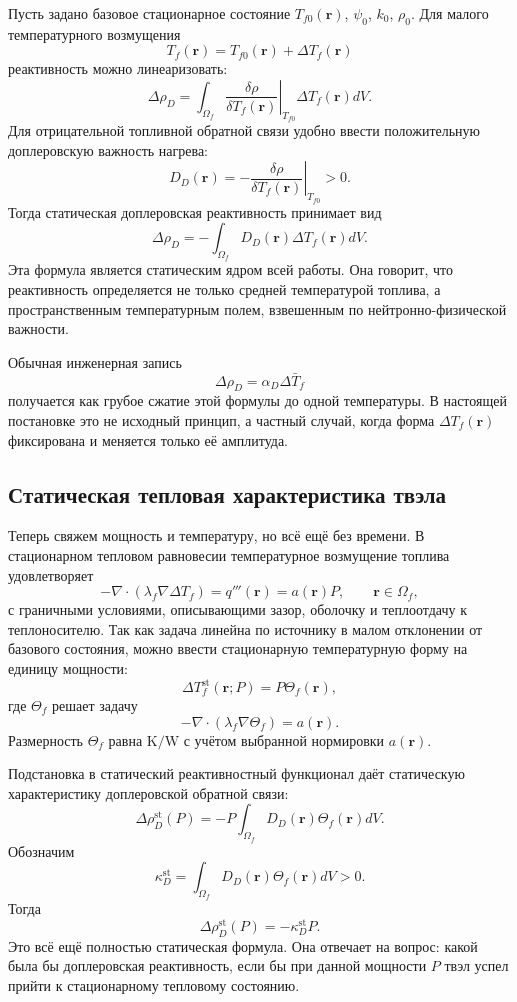 \documentclass[12pt]{article}
\begin{document}
Пусть задано базовое стационарное состояние \(T_{f0}(\mathbf r)\), \(\psi_0\), \(k_0\), \(\rho_0\). Для малого температурного возмущения
\[
T_f(\mathbf r)=T_{f0}(\mathbf r)+\Delta T_f(\mathbf r)
\]
реактивность можно линеаризовать:
\[
\Delta\rho_D
=
\int_{\Omega_f}
\left.
\frac{\delta\rho}{\delta T_f(\mathbf r)}
\right|_{T_{f0}}
\Delta T_f(\mathbf r)dV.
\]
Для отрицательной топливной обратной связи удобно ввести положительную доплеровскую важность нагрева:
\[
D_D(\mathbf r)
=
-
\left.
\frac{\delta\rho}{\delta T_f(\mathbf r)}
\right|_{T_{f0}}
>0.
\]
Тогда статическая доплеровская реактивность принимает вид
\[
\boxed{
\Delta\rho_D
=
-
\int_{\Omega_f}
D_D(\mathbf r)\Delta T_f(\mathbf r)dV.
}
\]
Эта формула является статическим ядром всей работы. Она говорит, что реактивность определяется не только средней температурой топлива, а пространственным температурным полем, взвешенным по нейтронно-физической важности.

Обычная инженерная запись
\[
\Delta\rho_D=\alpha_D\Delta\bar T_f
\]
получается как грубое сжатие этой формулы до одной температуры. В настоящей постановке это не исходный принцип, а частный случай, когда форма \(\Delta T_f(\mathbf r)\) фиксирована и меняется только её амплитуда.

\subsection{Статическая тепловая характеристика твэла}

Теперь свяжем мощность и температуру, но всё ещё без времени. В стационарном тепловом равновесии температурное возмущение топлива удовлетворяет
\[
-
\nabla\cdot\left(\lambda_f\nabla\Delta T_f\right)
=
q'''(\mathbf r)
=
a(\mathbf r)P,
\qquad
\mathbf r\in\Omega_f,
\]
с граничными условиями, описывающими зазор, оболочку и теплоотдачу к теплоносителю. Так как задача линейна по источнику в малом отклонении от базового состояния, можно ввести стационарную температурную форму на единицу мощности:
\[
\Delta T_f^{\mathrm{st}}(\mathbf r;P)
=P\Theta_f(\mathbf r),
\]
где \(\Theta_f\) решает задачу
\[
-
\nabla\cdot\left(\lambda_f\nabla\Theta_f\right)
=
a(\mathbf r).
\]
Размерность \(\Theta_f\) равна \(\mathrm{K/W}\) с учётом выбранной нормировки \(a(\mathbf r)\).

Подстановка в статический реактивностный функционал даёт статическую характеристику доплеровской обратной связи:
\[
\Delta\rho_D^{\mathrm{st}}(P)
=
-
P
\int_{\Omega_f}D_D(\mathbf r)\Theta_f(\mathbf r)dV.
\]
Обозначим
\[
\boxed{
\kappa_D^{\mathrm{st}}
=
\int_{\Omega_f}D_D(\mathbf r)\Theta_f(\mathbf r)dV>0.
}
\]
Тогда
\[
\boxed{
\Delta\rho_D^{\mathrm{st}}(P)=-\kappa_D^{\mathrm{st}}P.
}
\]
Это всё ещё полностью статическая формула. Она отвечает на вопрос: какой была бы доплеровская реактивность, если бы при данной мощности \(P\) твэл успел прийти к стационарному тепловому состоянию.
\end{document}
